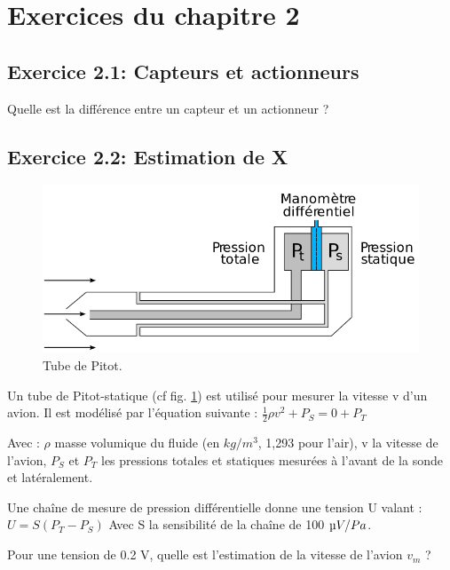 \documentclass[main.tex]{subfiles}
\begin{document}
\iftrue

\pagebreak

\section{Exercices du chapitre 2}

\subsection*{Exercice 2.1: Capteurs et actionneurs}
Quelle est la différence entre un capteur et un actionneur ?

\subsection*{Exercice 2.2: Estimation de X}

\begin{figure}[h!]
    \centering
    \includegraphics[width=13cm]{assets/figures/2_ex_Pitot.png}
    \caption{Tube de Pitot.}\vspace{5mm}
    \label{fig:2_Ex_Pitot}
    \centering
\end{figure}

Un tube de Pitot-statique (cf fig. \ref{fig:2_Ex_Pitot}) est utilisé pour mesurer la vitesse v d’un avion. Il est modélisé par l’équation suivante :
$ \frac {1}{2} \rho v^2  + P_S=0+P_T$

Avec : $\rho$ masse volumique du fluide (en $kg/m^3$, 1,293 pour l'air), v la vitesse de l’avion, $P_S$ et $P_T$ les pressions totales et statiques mesurées à l’avant de la sonde et latéralement.

Une chaîne de mesure de pression différentielle donne une tension U valant :
 $U=S(P_T-P_S)$
Avec S la sensibilité de la chaîne de 100 $\micro V/Pa$.

Pour une tension de 0.2 V, quelle est l’estimation de la vitesse de l’avion $v_m$ ?
\end{document}
